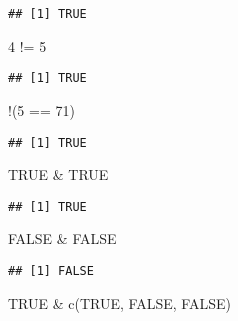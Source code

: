 \documentclass[
]{book}
\newenvironment{Shaded}{\begin{snugshade}}{\end{snugshade}}
\newcommand{\ConstantTok}[1]{\textcolor[rgb]{0.00,0.00,0.00}{#1}}
\newcommand{\DecValTok}[1]{\textcolor[rgb]{0.00,0.00,0.81}{#1}}
\newcommand{\FunctionTok}[1]{\textcolor[rgb]{0.00,0.00,0.00}{#1}}
\newcommand{\NormalTok}[1]{#1}
\newcommand{\SpecialCharTok}[1]{\textcolor[rgb]{0.00,0.00,0.00}{#1}}
\begin{document}
\begin{verbatim}
## [1] TRUE
\end{verbatim}

\begin{Shaded}
\begin{Highlighting}[]
\DecValTok{4} \SpecialCharTok{!=} \DecValTok{5}
\end{Highlighting}
\end{Shaded}

\begin{verbatim}
## [1] TRUE
\end{verbatim}

\begin{Shaded}
\begin{Highlighting}[]
\SpecialCharTok{!}\NormalTok{(}\DecValTok{5} \SpecialCharTok{==} \DecValTok{71}\NormalTok{)}
\end{Highlighting}
\end{Shaded}

\begin{verbatim}
## [1] TRUE
\end{verbatim}

\begin{Shaded}
\begin{Highlighting}[]
\ConstantTok{TRUE} \SpecialCharTok{\&} \ConstantTok{TRUE}
\end{Highlighting}
\end{Shaded}

\begin{verbatim}
## [1] TRUE
\end{verbatim}

\begin{Shaded}
\begin{Highlighting}[]
\ConstantTok{FALSE} \SpecialCharTok{\&} \ConstantTok{FALSE}
\end{Highlighting}
\end{Shaded}

\begin{verbatim}
## [1] FALSE
\end{verbatim}

\begin{Shaded}
\begin{Highlighting}[]
\ConstantTok{TRUE} \SpecialCharTok{\&} \FunctionTok{c}\NormalTok{(}\ConstantTok{TRUE}\NormalTok{, }\ConstantTok{FALSE}\NormalTok{, }\ConstantTok{FALSE}\NormalTok{)}
\end{Highlighting}
\end{Shaded}
\end{document}
